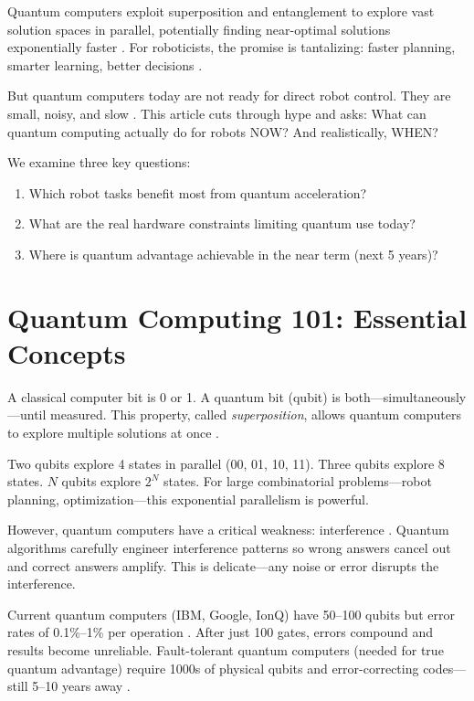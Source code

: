 \documentclass[conference]{IEEEtran}
\begin{document}
Quantum computers exploit superposition and entanglement to explore vast solution spaces in parallel, potentially finding near-optimal solutions exponentially faster \cite{b4, b5}. For roboticists, the promise is tantalizing: faster planning, smarter learning, better decisions \cite{b6, b7, b8}.

But quantum computers today are not ready for direct robot control. They are small, noisy, and slow \cite{b9, b10}. This article cuts through hype and asks: What can quantum computing actually do for robots NOW? And realistically, WHEN?

We examine three key questions:

\begin{enumerate}
\item Which robot tasks benefit most from quantum acceleration?
\item What are the real hardware constraints limiting quantum use today?
\item Where is quantum advantage achievable in the near term (next 5 years)?
\end{enumerate}

\section{Quantum Computing 101: Essential Concepts}

A classical computer bit is 0 or 1. A quantum bit (qubit) is both---simultaneously---until measured. This property, called \textit{superposition}, allows quantum computers to explore multiple solutions at once \cite{b4, b5}.

Two qubits explore 4 states in parallel (00, 01, 10, 11). Three qubits explore 8 states. $N$ qubits explore $2^N$ states. For large combinatorial problems---robot planning, optimization---this exponential parallelism is powerful.

However, quantum computers have a critical weakness: interference \cite{b4}. Quantum algorithms carefully engineer interference patterns so wrong answers cancel out and correct answers amplify. This is delicate---any noise or error disrupts the interference.

Current quantum computers (IBM, Google, IonQ) have 50--100 qubits but error rates of 0.1\%--1\% per operation \cite{b9, b10, b11}. After just 100 gates, errors compound and results become unreliable. Fault-tolerant quantum computers (needed for true quantum advantage) require 1000s of physical qubits and error-correcting codes---still 5--10 years away \cite{b13, b14}.
\end{document}
